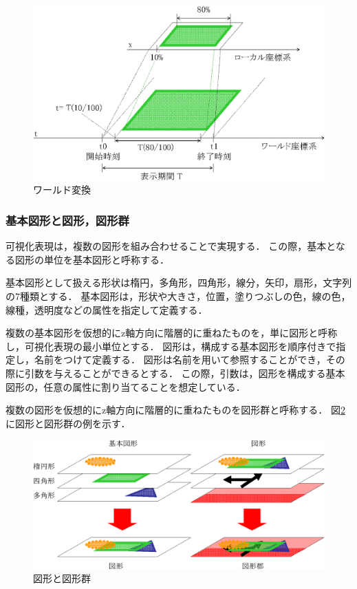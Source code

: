 \begin{figure}[tb]
\begin{center}
\includegraphics[scale=0.75]{img/worldTransform.eps}
\caption{ワールド変換}
\label{fig:worldTransform}
\end{center}
\end{figure}

\subsubsection{基本図形と図形，図形群}
可視化表現は，複数の図形を組み合わせることで実現する．
この際，基本となる図形の単位を基本図形と呼称する．

基本図形として扱える形状は楕円，多角形，四角形，線分，矢印，扇形，文字列の7種類とする．
基本図形は，形状や大きさ，位置，塗りつぶしの色，線の色，線種，透明度などの属性を指定して定義する．

複数の基本図形を仮想的にz軸方向に階層的に重ねたものを，単に図形と呼称し，可視化表現の最小単位とする．
図形は，構成する基本図形を順序付きで指定し，名前をつけて定義する．
図形は名前を用いて参照することができ，その際に引数を与えることができるとする．
この際，引数は，図形を構成する基本図形の，任意の属性に割り当てることを想定している．

複数の図形を仮想的にz軸方向に階層的に重ねたものを図形群と呼称する．
図\ref{fig:shapes}に図形と図形群の例を示す．

\begin{figure}[tb]
\begin{center}
\includegraphics[scale=0.75]{img/shapes.eps}
\caption{図形と図形群}
\label{fig:shapes}
\end{center}
\end{figure}

